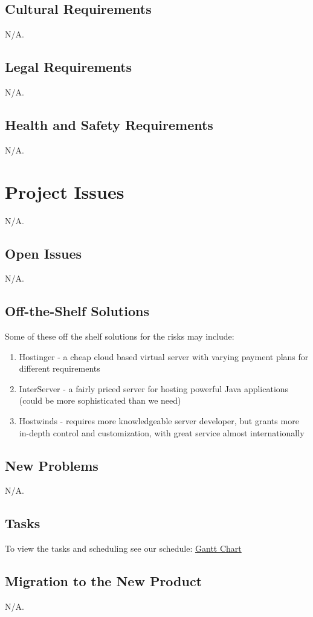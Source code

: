 \documentclass[12pt, titlepage]{article}
\begin{document}
\subsection{Cultural Requirements}
N/A.
\subsection{Legal Requirements}
N/A.
\subsection{Health and Safety Requirements}
N/A.
\section{Project Issues}
N/A.
\subsection{Open Issues}
N/A.
\subsection{Off-the-Shelf Solutions}
Some of these off the shelf solutions for the risks may include:

\begin{enumerate}
    \item Hostinger - a cheap cloud based virtual server with varying payment plans for different requirements
    \item InterServer - a fairly priced server for hosting powerful Java applications (could be more sophisticated than we need) 
    \item Hostwinds - requires more knowledgeable server developer, but grants more in-depth control and customization, with great service almost internationally
\end{enumerate}

\subsection{New Problems}
N/A.
\subsection{Tasks}
To view the tasks and scheduling see our schedule: \href{run:../Documentation/Development Plan/ProjectSchedule.pdf}{Gantt Chart}
\subsection{Migration to the New Product}
N/A.
\end{document}

